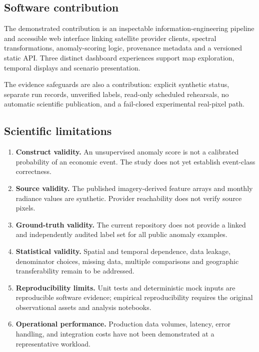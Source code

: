\subsection{Software contribution}

The demonstrated contribution is an inspectable information-engineering pipeline and accessible web interface linking satellite provider clients, spectral transformations, anomaly-scoring logic, provenance metadata and a versioned static API. Three distinct dashboard experiences support map exploration, temporal displays and scenario presentation.

The evidence safeguards are also a contribution: explicit synthetic status, separate run records, unverified labels, read-only scheduled rehearsals, no automatic scientific publication, and a fail-closed experimental real-pixel path.

\subsection{Scientific limitations}

\begin{enumerate}
  \item \textbf{Construct validity.} An unsupervised anomaly score is not a calibrated probability of an economic event. The study does not yet establish event-class correctness.
  \item \textbf{Source validity.} The published imagery-derived feature arrays and monthly radiance values are synthetic. Provider reachability does not verify source pixels.
  \item \textbf{Ground-truth validity.} The current repository does not provide a linked and independently audited label set for all public anomaly examples.
  \item \textbf{Statistical validity.} Spatial and temporal dependence, data leakage, denominator choices, missing data, multiple comparisons and geographic transferability remain to be addressed.
  \item \textbf{Reproducibility limits.} Unit tests and deterministic mock inputs are reproducible software evidence; empirical reproducibility requires the original observational assets and analysis notebooks.
  \item \textbf{Operational performance.} Production data volumes, latency, error handling, and integration costs have not been demonstrated at a representative workload.

\end{enumerate}
